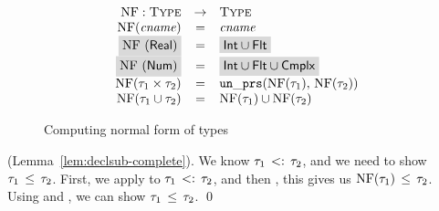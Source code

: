 \begin{figure}
  \[
	\begin{array}{rcl}
	\NF: \Type &\rightarrow& \Type \\
	\NF(\cname) &=& \cname \\
	\colorbox{light-gray}{\NF(\tyreal)} &=&
	\colorbox{light-gray}{\tyunion{\tyint}{\tyflt}} \\
	\colorbox{light-gray}{\NF(\tynum)} &=&
	\colorbox{light-gray}{\tyunion{\tyunion{\tyint}{\tyflt}}{\tycmplx}} \\
	\NF(\typair{\ty_1}{\ty_2}) &=& \unprs(\NF(\ty_1), \, \NF(\ty_2))	\\
	\NF(\tyunion{\ty_1}{\ty_2}) &=& \tyunion{\NF(\ty_1)}{\NF(\ty_2)} \\
	\end{array}
  \]
	\caption{Computing normal form of \BetaJulia types}
	\label{fig:bjsem-calc-nf}
\end{figure}

\noindent
\Proof (Lemma~\ref{lem:declsub-complete}).
We know $\tau_1 \, <: \, \tau_2$, and we need to show $\tau_1 \, \leq \, \tau_2$.
First, we apply  to $\tau_1 \, <: \, \tau_2$,
and then ,
this gives us $\mathop{\mathrm{NF}}(\tau_1) \, \leq \, \tau_2$.
Using  and , we can show
$\tau_1 \, \leq \, \tau_2$.
\qed